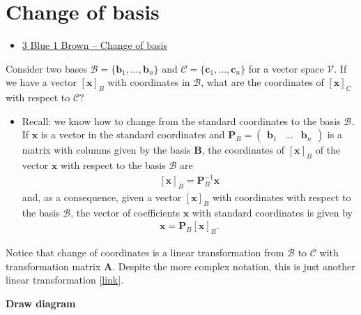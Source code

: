 \documentclass[
]{book}
\providecommand{\tightlist}{%
  \setlength{\itemsep}{0pt}\setlength{\parskip}{0pt}}
\theoremstyle{definition}
\theoremstyle{definition}
\theoremstyle{definition}
\theoremstyle{remark}
\begin{document}
\hypertarget{change-of-basis}{%
\chapter{Change of basis}\label{change-of-basis}}

\begin{itemize}
\tightlist
\item
  \href{https://www.3blue1brown.com/lessons/change-of-basis}{3 Blue 1 Brown -- Change of basis}
\end{itemize}

Consider two bases \(\mathcal{B} = \{ \mathbf{b}_1, \ldots, \mathbf{b}_n \}\) and \(\mathcal{C} = \{ \mathbf{c}_1, \ldots, \mathbf{c}_n \}\) for a vector space \(\mathcal{V}\). If we have a vector \([\mathbf{x}]_B\) with coordinates in \(\mathcal{B}\), what are the coordinates of \([\mathbf{x}]_C\) with respect to \(\mathcal{C}\)?

\begin{itemize}
\tightlist
\item
  Recall: we know how to change from the standard coordinates to the basis \(\mathcal{B}\). If \(\mathbf{x}\) is a vector in the standard coordinates and \(\mathbf{P}_B = \begin{pmatrix} \mathbf{b}_1 & \ldots & \mathbf{b}_n \end{pmatrix}\) is a matrix with columns given by the basis \(\mathbf{B}\), the coordinates of \([\mathbf{x}]_B\) of the vector \(\mathbf{x}\) with respect to the basis \(\mathcal{B}\) are
  \[
  \begin{aligned}
  [\mathbf{x}]_B = \mathbf{P}_B^{-1} \mathbf{x}
  \end{aligned}
  \]
  and, as a consequence, given a vector \([\mathbf{x}]_B\) with coordinates with respect to the basis \(\mathcal{B}\), the vector of coefficients \(\mathbf{x}\) with standard coordinates is given by
  \[
  \begin{aligned}
  \mathbf{x} = \mathbf{P}_B [\mathbf{x}]_B.
  \end{aligned}
  \]
\end{itemize}

Notice that change of coordinates is a linear transformation from \(\mathcal{B}\) to \(\mathcal{C}\) with transformation matrix \(\mathbf{A}\). Despite the more complex notation, this is just another linear transformation {[}\href{https://www.youtube.com/watch?v=VGhij2qmOs4}{link}{]}.

\textbf{Draw diagram}
\end{document}
